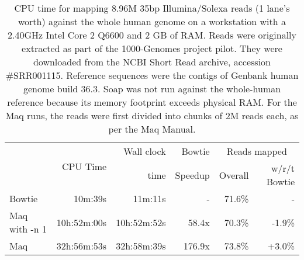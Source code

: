 \documentclass[letterpaper]{article}
\begin{document}
\begin{table}[tp]
\scriptsize
\begin{tabular}{lrrrrr}\toprule
 & \multirow{2}{*}{CPU Time} & Wall clock & Bowtie  & \multicolumn{2}{c}{Reads mapped} \\
 &                            & time       & Speedup & Overall    & w/r/t Bowtie \\[3pt]
\toprule
Bowtie & 10m:39s & 11m:11s & - & 71.6\% & - \\\midrule
Maq with -n 1 & 10h:52m:00s & 10h:52m:52s & 58.4x & 70.3\% & -1.9\% \\\midrule
Maq & 32h:56m:53s & 32h:58m:39s & 176.9x & 73.8\% & +3.0\% \\
\bottomrule
\end{tabular}
\caption{CPU time for mapping 8.96M 35bp Illumina/Solexa reads (1 lane's worth) against the whole human genome on a workstation with a 2.40GHz Intel Core 2 Q6600 and 2 GB of RAM. Reads were originally extracted as part of the 1000-Genomes project pilot. They were downloaded from the NCBI Short Read archive, accession \#SRR001115. Reference sequences were the contigs of Genbank human genome build 36.3. Soap was not run against the whole-human reference because its memory footprint exceeds physical RAM. For the Maq runs, the reads were first divided into chunks of 2M reads each, as per the Maq Manual.}
\end{table}
\end{document}

